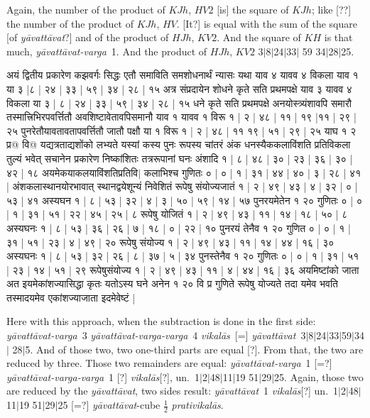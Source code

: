 \documentclass[12pt]{book}
\def\prativikalas{\textit{prati\-vi\-ka\-l\=as}}
\def\ya{\textit{y\=avat\-t\=avat}}
\def\yava{\textit{y\=avat\-t\=avat-varga}}
\def\yavava{\textit{y\=avat\-t\=avat-varga-varga}}
\def\vikalas{\textit{vi\-ka\-l\=as}}
\def\danda{$|$}
\begin{document}
Again, the number of the product of $KJh$, $HV2$ [is] the square of $KJh$; like [??]
the number of the product of $KJh$, $HV$. [It?] is equal with the sum of the square [of
\ya?] and of the
product of $HJh$, $KV2$. And the square of $KH$ is that much, \yava\ 1. And the
product of $HJh$, $KV2$ 3\danda 8\danda 24\danda 33\danda
59 34\danda 28\danda 25. 

\newpage

{\s अयं
द्वितीय प्रकारेण कझवर्गः सिद्धः एतौ समाविति समशोधनार्थं न्यासः
यथा याव ४ यावव ४ विकला याव १ या ३ |८ | २४ | ३३ | ५९ | ३४ | २८ | १५ अत्र
संप्रदायेन शोधने कृते सति प्रथमपक्षे याव ३ यावव ४ विकला या ३ | ८ | २४ |
३३ | ५९ | ३४ | २८ | १५ धने कृते सति प्रथमपक्षे अनयोस्त्र्यंशावपि समारौ
तस्मात्त्रिभिरपवर्त्तितौ अवशिष्टावेतावपिसमानौ याव १ यावव १ विरू १ | २ | ४८ | ११ |
१९ |११ | २९ |२५
पुनरेतौयावतावतापवर्त्तितौ जातौ पक्षौ या १ विरू १ | २ | ४८ | ११ १९ | ५१ | २९ | २५ याघ १ २ प्र@ वि@
यद्यत्रताद्यशोंको लभ्यते यस्यां कस्य पुनः रूपस्य चांतरं अंक धनस्यैककलाविंशति प्रतिविकला तुल्यं भवेत्
सचानेन प्रकारेण निष्कांशितः तत्ररूपानां घनः अंशादि १ | ८ | ४८ | ३० | २३ | ३६ | ३० | ४२ | १८ अयमेकयाकलयाविंशतिप्रतिवि$|$ कलाभिश्च गुणितः ० | ० | १ | ३१ | ४४ | ४० | ३ | २८ | ४१ | अंशकलास्थानयोरभावात् स्थानद्वयेशून्यं निवेशितं
रूपेषु संयोज्यजातं १ | २ | ४९ | ४३ | ४ | ३२ | ० | ५३ | ४१ अस्यघन १ | ८ | ५३ | ३२ | ४ | ३ | ५० | ५९ | १४ | ५७ पुनरयमेतेन १ २० गुणितः ० | ० | १ | ३१ | ५१ | २२ | ४५ | २५ | ८ रूपेषु योजितं १ | २ | ४९ | ४३ | ११ | १४ | १८ | ५० | ८ अस्यघनः १ | ८ | ५३ | ३६ | २६ | ७ | १८ | ० | २२ | १० पुनरयं तेनैव १ २० गुणित ० | ० | १ | ३१ | ५१ | २३ | ४ | ४९ | २० रूपेषु संयोज्य १ | २ | ४९ | ४३ | ११ | १४ | ४४ | १६ | ३० अस्यघनः १ | ८ | ५३ | ३२ | २६ | ८ | ३७ | ५ | ३४ पुनस्तेनैव १ २० गुणितः ० | ० | १ | ३१ | ५१ | २३ | १४ | ५१ | २९
रूपेषुसंयोज्य १ | २ | ४९ | ४३ | ११ | ४ | ४४ | १६ | ३६ अयमिष्टांको जाता अत इयमेकांशज्यासिद्धा कृतः यतोऽस्य घने अनेन १ २० वि प्र
गुणिते रूपेषु योज्यते तदा यमेव भवति तस्मादयमेव
एकांशज्याजाता इदमेवेष्टं |}

\newpage

Here with this approach, when the subtraction is done in the first side:
\yava\ 3 \yavava\ 4 \vikalas\ [=] \ya\ 3\danda 8\danda 24\danda 33\danda 59\danda 34\danda
28\danda 5. And of those two, two one-third parts are equal [?]. 
From that, the two are reduced by three. Those two remainders are equal:
\yava\ 1 [=?] \yavava\ 1 [?] \vikalas [?], un.\ 1\danda 2\danda 48\danda 11\danda 19
51\danda 29\danda 25.
Again, those two are reduced by the \ya, two sides result: 
\ya\ 1 \vikalas [?] un.\  1\danda 2\danda 48\danda 11\danda 19
51\danda 29\danda 25 [=?] \ya-cube $\frac{1}{2}$ \prativikalas.
\end{document}
